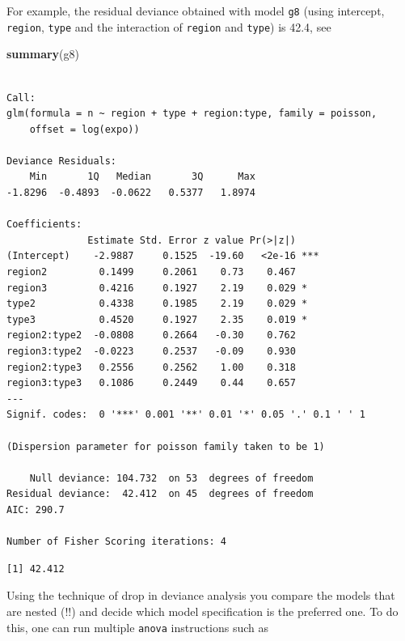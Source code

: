\documentclass[
]{book}
\newenvironment{Shaded}{\begin{snugshade}}{\end{snugshade}}
\newcommand{\KeywordTok}[1]{\textcolor[rgb]{0.13,0.29,0.53}{\textbf{#1}}}
\newcommand{\NormalTok}[1]{#1}
\newcommand{\OperatorTok}[1]{\textcolor[rgb]{0.81,0.36,0.00}{\textbf{#1}}}
\begin{document}
For example, the residual deviance obtained with model \texttt{g8} (using intercept, \texttt{region}, \texttt{type} and the interaction of \texttt{region} and \texttt{type}) is 42.4, see

\begin{Shaded}
\begin{Highlighting}[]
\KeywordTok{summary}\NormalTok{(g8)}
\end{Highlighting}
\end{Shaded}

\begin{verbatim}

Call:
glm(formula = n ~ region + type + region:type, family = poisson, 
    offset = log(expo))

Deviance Residuals: 
    Min       1Q   Median       3Q      Max  
-1.8296  -0.4893  -0.0622   0.5377   1.8974  

Coefficients:
              Estimate Std. Error z value Pr(>|z|)    
(Intercept)    -2.9887     0.1525  -19.60   <2e-16 ***
region2         0.1499     0.2061    0.73    0.467    
region3         0.4216     0.1927    2.19    0.029 *  
type2           0.4338     0.1985    2.19    0.029 *  
type3           0.4520     0.1927    2.35    0.019 *  
region2:type2  -0.0808     0.2664   -0.30    0.762    
region3:type2  -0.0223     0.2537   -0.09    0.930    
region2:type3   0.2556     0.2562    1.00    0.318    
region3:type3   0.1086     0.2449    0.44    0.657    
---
Signif. codes:  0 '***' 0.001 '**' 0.01 '*' 0.05 '.' 0.1 ' ' 1

(Dispersion parameter for poisson family taken to be 1)

    Null deviance: 104.732  on 53  degrees of freedom
Residual deviance:  42.412  on 45  degrees of freedom
AIC: 290.7

Number of Fisher Scoring iterations: 4
\end{verbatim}

\begin{Shaded}
\end{Shaded}

\begin{verbatim}
[1] 42.412
\end{verbatim}

Using the technique of drop in deviance analysis you compare the models that are nested (!!) and decide which model specification is the preferred one. To do this, one can run multiple \texttt{anova} instructions such as
\end{document}
